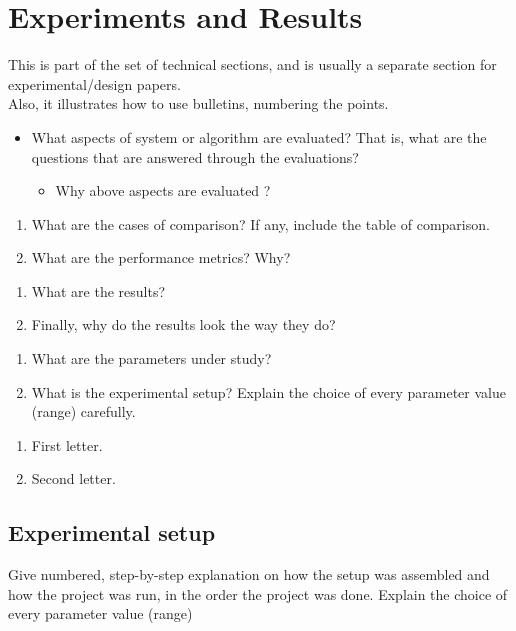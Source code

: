 \chapter{Experiments and Results}

This is part of the set of technical sections, and is usually a separate section for experimental/design papers.\\
Also, it illustrates how to use bulletins, numbering the points.

\begin{itemize} 
	\item What aspects of system or algorithm are evaluated? That is, what are the questions that are answered through the evaluations? 
		\begin{itemize}
			\item Why above aspects are evaluated ? 
		\end{itemize}
\end{itemize}

\begin{enumerate}[label=\Roman*]
	\item What are the cases of comparison? If any, include the table of comparison.
	\item What are the performance metrics? Why? 
\end{enumerate}

\begin{enumerate}[label=\roman*]
	\item What are the results? 
	\item Finally, why do the results look the way they do?
\end{enumerate}

\begin{enumerate}
	\item What are the parameters under study? 
	\item What is the experimental setup? Explain the choice of every parameter value (range) carefully. 
\end{enumerate}


\begin{enumerate}[label=\alph*]
	\item First letter.
	\item Second letter.
\end{enumerate}

\section{Experimental setup}
Give numbered, step-by-step explanation on how the setup was assembled and how the project was run, in the order the project was done. Explain the choice of every parameter value (range)\\

